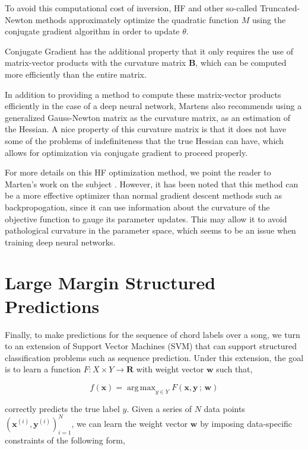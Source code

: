 \documentclass{article}
\DeclareMathOperator*{\argmax}{arg\,max}
\begin{document}
To avoid this computational cost of inversion, HF and other so-called
Truncated-Newton methods approximately optimize the quadratic function $M$
using the conjugate gradient algorithm in order to update $\theta$.

Conjugate Gradient has the additional property that it only requires the use
of matrix-vector products with the curvature matrix $\mathbf{B}$, which can
be computed more efficiently than the entire matrix.

In addition to providing a method to compute these matrix-vector products efficiently
in the case of a deep neural network, Martens also recommends using a generalized
Gauss-Newton matrix as the curvature matrix, as an estimation of the Hessian.
A nice property of this curvature matrix is that it does not have some of the
problems of indefiniteness that the true Hessian can have, which allows for 
optimization via conjugate gradient to proceed properly. 

For more details on this HF optimization method, we point the reader to
Marten's work on the subject \cite{martens2010deep}. However, it has been noted
that this method can be a more effective optimizer than normal gradient descent
methods such as backpropogation, since it can use information about the curvature
of the objective function to gauge its parameter updates. This may allow it
to avoid pathological curvature in the parameter space, which seems to be an
issue when training deep neural networks.

\section{Large Margin Structured Predictions}
\label{sec:svms}

Finally, to make predictions for the sequence of chord labels over a song,
we turn to an extension of Support Vector Machines (SVM) that can support
structured classification problems such as sequence prediction. Under this
extension, the goal is to learn a function $F : X \times Y \rightarrow
\mathbf{R}$ with weight vector $\mathbf{w}$ such that,

\begin{equation*}
f(\mathbf{x}) = \argmax_{y \in Y}F(\mathbf{x},\mathbf{y}\,;\,\mathbf{w})
\end{equation*}

correctly predicts the true label $y$. Given a series of $N$ data points
$(\mathbf{x}^{(i)}, \mathbf{y}^{(i)})_{i=1}^{N}$, we can learn the weight
vector $\mathbf{w}$ by imposing data-specific constraints of the following
form,
\end{document}

